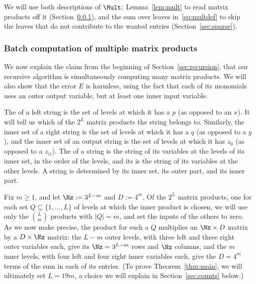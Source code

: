 We will use both descriptions of $\Mult$: Lemma~\ref{lem:mult} to read matrix products off it (Section~\ref{sec:defs}), and the sum over leaves in~\eqref{eq:multdef} to skip the leaves that do not contribute to the wanted entries (Section~\ref{sec:sparse}).

\subsubsection{Batch computation of multiple matrix products}\label{sec:defs}

We now explain the claim from the beginning of Section~\ref{sec:recursion}, that our recursive algorithm is simultaneously computing many matrix products. We will also show that the error $E$ is harmless, using the fact that each of its monomials uses an outer output variable, but at least one inner input variable.

The  of a left string is the set of levels at which it has a $p$ (as opposed to an $x$). It will tell us which of the $2^L$ matrix products the string belongs to. Similarly, the inner set of a right string is the set of levels at which it has a $q$ (as opposed to a $y$), and the inner set of an output string is the set of levels at which it has $z_0$ (as opposed to a $z_{ij}$). The  of a string is the string of its variables at the levels of its inner set, in the order of the levels, and its  is the string of its variables at the other levels. A string is determined by its inner set, its outer part, and its inner part.

Fix $m\ge1$, and let $\Nz:=3^{L-m}$ and $D:=4^m$. Of the $2^L$ matrix products, one for each set $Q\subseteq\{1,\dots,L\}$ of levels at which the inner product is chosen, we will use only the $\binom Lm$ products with $|Q|=m$, and set the inputs of the others to zero. As we now make precise, the product for such a $Q$ multiplies an $\Nz\times D$ matrix by a $D\times\Nz$ matrix: the $L-m$ outer levels, with three left and three right outer variables each, give its $\Nz=3^{L-m}$ rows and $\Nz$ columns, and the $m$ inner levels, with four left and four right inner variables each, give the $D=4^m$ terms of the sum in each of its entries. (To prove Theorem~\ref{thm:main}, we will ultimately set $L=19m$, a choice we will explain in Section~\ref{sec:counts} below.) 

